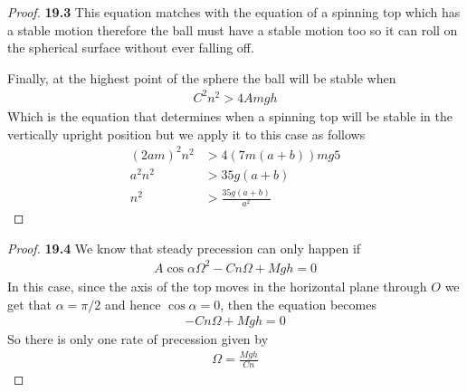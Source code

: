 \documentclass[11pt]{article}
\theoremstyle{definition}
\begin{document}
\begin{proof}{\textbf{19.3}}
    This equation matches with the equation of a spinning top which has a
    stable motion therefore the ball must have a stable motion too so it
    can roll on the spherical surface without ever falling off.

    Finally, at the highest point of the sphere the ball will be stable when 
    \begin{align*}
        C^2n^2 > 4Amgh
    \end{align*}
    Which is the equation that determines when a spinning top will be stable
    in the vertically upright position but we apply it to this case as follows
    \begin{align*}
        (2am)^2n^2 &> 4(7m(a + b))mg5 \\
        a^2n^2 &> 35g(a + b) \\
        n^2 &> \frac{35g(a + b)}{a^2}
    \end{align*}
\end{proof}
\cleardoublepage
\begin{proof}{\textbf{19.4}}
    We know that steady precession can only happen if 
    \begin{align*}
        A\cos\alpha \Omega^2 - C n \Omega + Mgh = 0
    \end{align*}
    In this case, since the axis of the top moves in the horizontal plane
    through $O$ we get that $\alpha = \pi/2$ and hence $\cos\alpha = 0$, then
    the equation becomes
    \begin{align*}
        - C n \Omega + Mgh = 0
    \end{align*}
    So there is only one rate of precession given by
    \begin{align*}
        \Omega = \frac{Mgh}{Cn}
    \end{align*}
\end{proof}
\cleardoublepage
\end{document}
